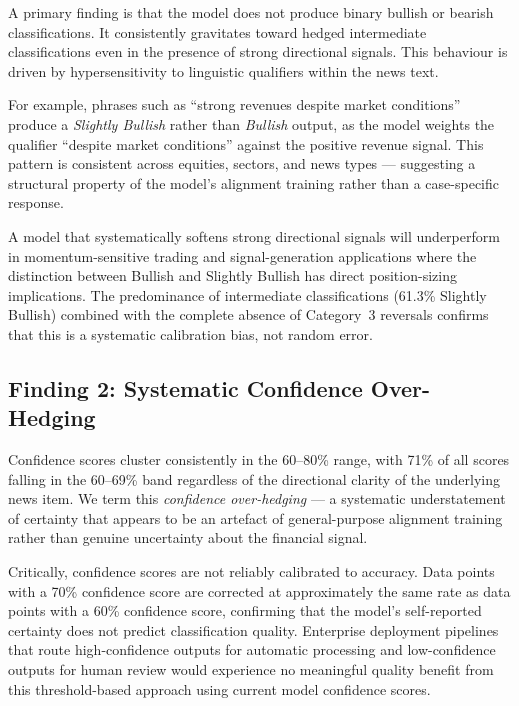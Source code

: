 \documentclass[11pt,a4paper]{article}
\begin{document}
A primary finding is that the model does not produce binary bullish or bearish
classifications. It consistently gravitates toward hedged intermediate classifications
even in the presence of strong directional signals. This behaviour is driven by
hypersensitivity to linguistic qualifiers within the news text.

For example, phrases such as ``strong revenues despite market conditions'' produce a
\textit{Slightly Bullish} rather than \textit{Bullish} output, as the model weights the
qualifier ``despite market conditions'' against the positive revenue signal. This pattern
is consistent across equities, sectors, and news types --- suggesting a structural
property of the model's alignment training rather than a case-specific response.

A model that systematically softens strong directional signals will underperform in
momentum-sensitive trading and signal-generation applications where the distinction
between Bullish and Slightly Bullish has direct position-sizing implications. The
predominance of intermediate classifications (61.3\% Slightly Bullish) combined with
the complete absence of Category~3 reversals confirms that this is a systematic
calibration bias, not random error.

\subsection{Finding 2: Systematic Confidence Over-Hedging}

Confidence scores cluster consistently in the 60--80\% range, with 71\% of all scores
falling in the 60--69\% band regardless of the directional clarity of the underlying
news item. We term this \textit{confidence over-hedging} --- a systematic understatement
of certainty that appears to be an artefact of general-purpose alignment training
rather than genuine uncertainty about the financial signal.

Critically, confidence scores are not reliably calibrated to accuracy. Data points with
a 70\% confidence score are corrected at approximately the same rate as data points
with a 60\% confidence score, confirming that the model's self-reported certainty does
not predict classification quality. Enterprise deployment pipelines that route
high-confidence outputs for automatic processing and low-confidence outputs for
human review would experience no meaningful quality benefit from this
threshold-based approach using current model confidence scores.
\end{document}

